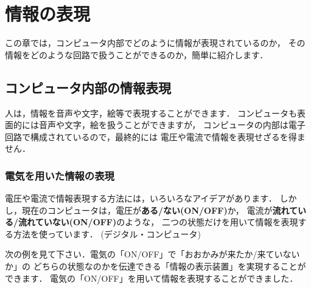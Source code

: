\renewcommand{\myepsfbox}[1]{\epsfbox{chap2/#1}}

\chapter{情報の表現}
この章では，コンピュータ内部でどのように情報が表現されているのか，
その情報をどのような回路で扱うことができるのか，簡単に紹介します．

\section{コンピュータ内部の情報表現}
人は，情報を音声や文字，絵等で表現することができます．
コンピュータも表面的には音声や文字，絵を扱うことができますが，
コンピュータの内部は電子回路で構成されているので，最終的には
電圧や電流で情報を表現せざるを得ません．

\begin{center}
\fbox{\parbox{7cm}{
\[ 情報の表現  =  \left(
 \begin{array}{l}
  人 : 音声，文字，絵，．．． \\
  コンピュータ : 電圧，電流 \\
 \end{array} \right)
\]
}}
\end{center}

\subsection{電気を用いた情報の表現}
電圧や電流で情報表現する方法には，いろいろなアイデアがあります．
しかし，現在のコンピュータは，電圧が{\bf ある/ない(ON/OFF)}か，
電流が{\bf 流れている/流れていない(ON/OFF)}のような，
二つの状態だけを用いて情報を表現する方法を使っています．
(デジタル・コンピュータ)

\begin{center}
\end{center}

次の例を見て下さい．電気の「ON/OFF」で「おおかみが来たか/来ていないか」の
どちらの状態なのかを伝達できる「情報の表示装置」を実現することができます．
電気の「ON/OFF」を用いて情報を表現することができました．

